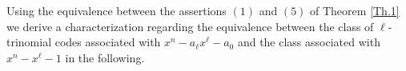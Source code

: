 \documentclass[12pt]{elsarticle}
\newcommand{\Fq}{\mathbb{F}_{q}}
\theoremstyle{break}
{\theorembodyfont{\upshape}
    \newtheorem{theorem}{Theorem}[section] %
    \newtheorem{lemma}[theorem]{Lemma} %
    \newtheorem{proposition}[theorem]{Proposition}
    \newtheorem{corollary}[theorem]{Corollary}
    \newtheorem{definition}[theorem]{Definition}
    \newtheorem{example}[theorem]{Example}
    \newtheorem{remark}[theorem]{Remark}
    \newtheorem{conjecture}[theorem]{Conjecture}
    \newtheorem*{proof}{{Proof}}
	\newtheorem*{notation}{Notation}
	\newtheorem*{main}{Cain Theorem}
	\newtheorem*{problem}{Problem}
}
\begin{document}
Using the equivalence between the assertions $(1)$ and $(5)$ of Theorem \ref{Th.1} we derive a characterization regarding the equivalence between the class of $\ell$-trinomial codes  associated with  $x^n - a_{\ell}x^{\ell} - a_0$ and the class  associated with $x^n - x^{\ell} - 1$ in the following.
 
\end{document}
